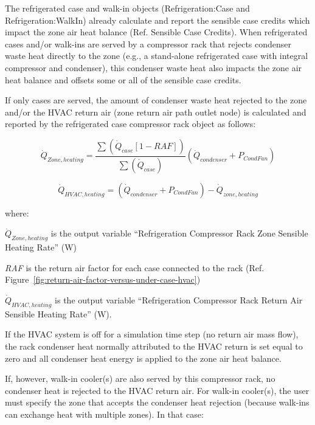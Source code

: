 The refrigerated case and walk-in objects (Refrigeration:Case and Refrigeration:WalkIn) already calculate and report the sensible case credits which impact the zone air heat balance (Ref. Sensible Case Credits). When refrigerated cases and/or walk-ins are served by a compressor rack that rejects condenser waste heat directly to the zone (e.g., a stand-alone refrigerated case with integral compressor and condenser), this condenser waste heat also impacts the zone air heat balance and offsets some or all of the sensible case credits.

If only cases are served, the amount of condenser waste heat rejected to the zone and/or the HVAC return air (zone return air path outlet node) is calculated and reported by the refrigerated case compressor rack object as follows:

\begin{equation}
{\dot Q_{Zone,heating}} = \frac{{\sum {\left( {{{\dot Q}_{case}}[1 - RAF]} \right)} }}{{\sum {\left( {{{\dot Q}_{case}}} \right)} }} \left( {{{\dot Q}_{condenser}} + {P_{CondFan}}} \right)
\end{equation}

\begin{equation}
{\dot Q_{HVAC,heating}} = \left( {{{\dot Q}_{condenser}} + {P_{CondFan}}} \right) - {\dot Q_{zone,heating}}
\end{equation}

where:

\({\dot Q_{Zone,heating}}\) is the output variable ``Refrigeration Compressor Rack Zone Sensible Heating Rate'' (W)

\emph{RAF} is the return air factor for each case connected to the rack (Ref. Figure~\ref{fig:return-air-factor-versus-under-case-hvac})

\({\dot Q_{HVAC,heating}}\) is the output variable ``Refrigeration Compressor Rack Return Air Sensible Heating Rate'' (W).

If the HVAC system is off for a simulation time step (no return air mass flow), the rack condenser heat normally attributed to the HVAC return is set equal to zero and all condenser heat energy is applied to the zone air heat balance.

If, however, walk-in cooler(s) are also served by this compressor rack, no condenser heat is rejected to the HVAC return air. For walk-in cooler(s), the user must specify the zone that accepts the condenser heat rejection (because walk-ins can exchange heat with multiple zones). In that case:

